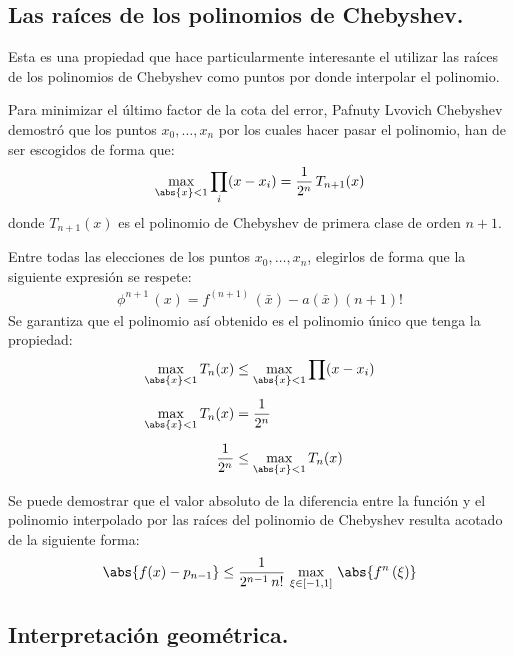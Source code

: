 \subsection{Las raíces de los polinomios de Chebyshev.}

Esta es una propiedad que hace particularmente interesante el utilizar las raíces de los polinomios de Chebyshev como puntos por donde interpolar el polinomio.
\par
Para minimizar el último factor de la cota del error, Pafnuty Lvovich Chebyshev demostró que los puntos $x_{0}, \ldots, x_{n}$ por los cuales hacer pasar el polinomio, han de ser escogidos de forma que:
\begin{align*}
\max_{\abs{x} < 1} \prod_{i} (x - x_{i}) = \dfrac{1}{2^{n}} \, T_{n+1} (x)
\end{align*}
donde $T_{n+1}(x)$ es el polinomio de Chebyshev de primera clase de orden $n + 1$.
\par
Entre todas las elecciones de los puntos $x_{0}, \ldots, x_{n}$, elegirlos de forma que la siguiente expresión se respete:
\begin{align*}
\phi^{n+1} \, (x) = f^{(n+1)} \, (\bar{x}) - a (\bar{x}) (n + 1)!
\end{align*}
Se garantiza que el polinomio así obtenido es el polinomio único que tenga la propiedad:
\begin{align*}
\max_{\abs{x} < 1} T_{n} (x) &\leq \max_{\abs{x} < 1} \prod (x - x_{i}) \\[0.5em]
\max_{\abs{x} < 1} T_{n} (x) &= \dfrac{1}{2^{n}} \\[0.5em]
\dfrac{1}{2^{n}} &\leq \max_{\abs{x} < 1} T_{n} (x)
\end{align*}

Se puede demostrar que el valor absoluto de la diferencia entre la función y el polinomio interpolado por las raíces del polinomio de Chebyshev resulta acotado de la siguiente forma:
\begin{align*}
\abs{f(x) - p_{n-1}} \leq \dfrac{1}{2^{n-1} \, n!} \, \max_{\xi \in [-1, 1]}  \, \abs{f^{n} \, (\xi)}
\end{align*}

\subsection{Interpretación geométrica.}

